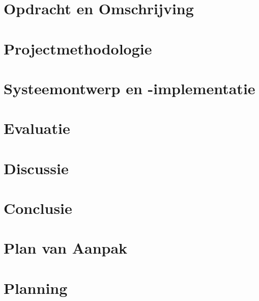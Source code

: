 \documentclass[dutch]{style/tudelft-report}
\begin{document}
\chapter{Opdracht en Omschrijving} \label{ch:opdracht-en-omschrijving} 

\chapter{Projectmethodologie} \label{ch:project-methodologie} 

\chapter{Systeemontwerp en -implementatie} \label{ch:systeem-ontwerp-en-implementatie} 

\chapter{Evaluatie} \label{ch:evaluatie} 

\chapter{Discussie} \label{ch:discussie} 

\chapter{Conclusie} \label{ch:conclusie} 

\appendix



\chapter{Plan van Aanpak} \label{ch:plan-van-aanpak} 

\chapter{Planning} \label{ch:planning} 
\end{document}
